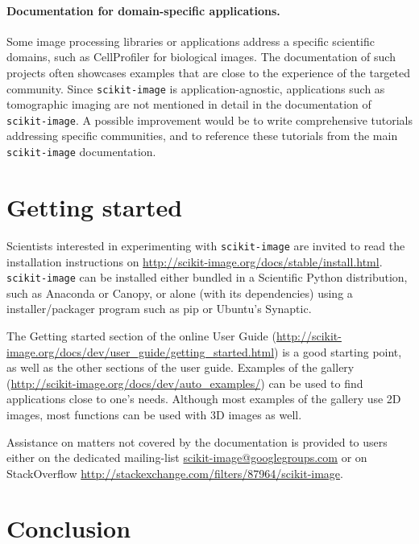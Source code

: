 \documentclass[twocolumn]{bmcart}%
\begin{document}
\paragraph{Documentation for domain-specific applications.} Some image
processing libraries or applications address a specific scientific
domains, such as CellProfiler \citep{Carpenter2006, Lamprecht2007} for
biological images. The documentation of such projects often showcases
examples that are close to the experience of the targeted community.
Since \texttt{scikit-image} is application-agnostic,
applications such as tomographic imaging are not mentioned in detail in the
documentation of \texttt{scikit-image}. A possible improvement would be
to write comprehensive tutorials addressing specific communities, and to
reference these tutorials from the main \texttt{scikit-image}
documentation.

\section*{Getting started}

Scientists interested in experimenting with \texttt{scikit-image} are
invited to read the installation instructions on
\url{http://scikit-image.org/docs/stable/install.html}.
\texttt{scikit-image} can be installed either bundled in a Scientific
Python distribution, such as Anaconda or Canopy, or alone (with its
dependencies) using a installer/packager program such as pip or Ubuntu's
Synaptic.

The Getting started section of the online User Guide
(\url{http://scikit-image.org/docs/dev/user_guide/getting_started.html})
is a good starting point, as well as the other sections of the user
guide. Examples of the gallery
(\url{http://scikit-image.org/docs/dev/auto_examples/}) can be used to
find applications close to one's needs. Although most examples of the
gallery use 2D images, most functions can be used with 3D images as well.

Assistance on matters not covered by the documentation is provided to
users either on the dedicated mailing-list
\url{scikit-image@googlegroups.com} or on StackOverflow
\url{http://stackexchange.com/filters/87964/scikit-image}.

\section*{Conclusion}
\end{document}
